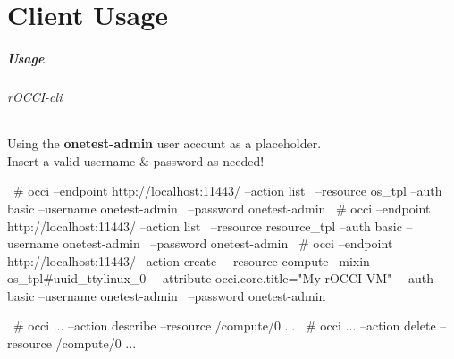 \part{Client Usage}

\begin{frame}[fragile]
  \frametitle{Usage}
  \framesubtitle{rOCCI-cli}

  \begin{center}
    Using the \textbf{onetest-admin} user account as a placeholder.\\
    Insert a valid username \& password as needed!
  \end{center}

\begin{terminalbox}{}
~# occi --endpoint http://localhost:11443/ --action list \
        --resource os_tpl --auth basic --username onetest-admin \
        --password onetest-admin
~# occi --endpoint http://localhost:11443/ --action list \
        --resource resource_tpl --auth basic --username onetest-admin \
        --password onetest-admin
~# occi --endpoint http://localhost:11443/ --action create \
        --resource compute --mixin os_tpl#uuid_ttylinux_0 \
        --attribute occi.core.title="My rOCCI VM" \
        --auth basic --username onetest-admin \
        --password onetest-admin

~# occi ... --action describe --resource /compute/0 ...
~# occi ... --action delete --resource /compute/0 ...
\end{terminalbox}

\end{frame}
